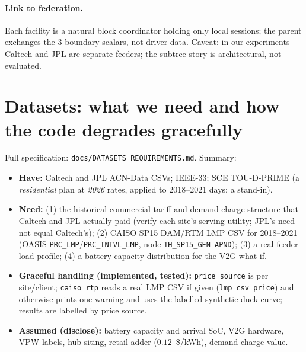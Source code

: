 \documentclass[10pt,a4paper]{article}
\begin{document}
\paragraph{Link to federation.} Each facility is a natural block coordinator holding only local sessions; the parent exchanges the 3 boundary scalars,
not driver data. Caveat: in our experiments Caltech and JPL are separate feeders; the subtree story is architectural, not evaluated.

\section{Datasets: what we need and how the code degrades gracefully}\label{sec:data}
Full specification: \texttt{docs/DATASETS\_REQUIREMENTS.md}. Summary:
\begin{itemize}
\item \textbf{Have:} Caltech and JPL ACN-Data CSVs; IEEE-33; SCE TOU-D-PRIME (a \emph{residential} plan at \emph{2026} rates, applied to 2018--2021 days: a stand-in).
\item \textbf{Need:} (1) the historical commercial tariff and demand-charge structure that Caltech and JPL actually paid (verify each site's serving utility; JPL's need not equal Caltech's);
(2) CAISO SP15 DAM/RTM LMP CSV for 2018--2021 (OASIS \texttt{PRC\_LMP}/\texttt{PRC\_INTVL\_LMP}, node \texttt{TH\_SP15\_GEN-APND}); (3) a real feeder load profile; (4) a battery-capacity distribution for the V2G what-if.
\item \textbf{Graceful handling (implemented, tested):} \texttt{price\_source} is per site/client; \texttt{caiso\_rtp} reads a real LMP CSV if given
(\texttt{lmp\_csv\_price}) and otherwise prints one warning and uses the labelled synthetic duck curve; results are labelled by price source.
\item \textbf{Assumed (disclose):} battery capacity and arrival SoC, V2G hardware, VPW labels, hub siting, retail adder ($0.12$~\$/kWh), demand charge value.
\end{itemize}
\end{document}
